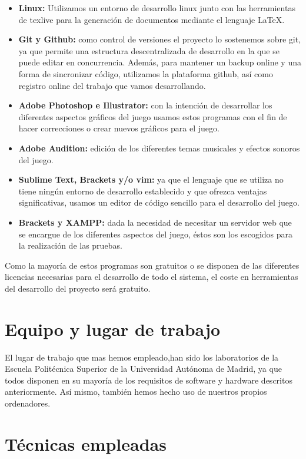 \documentclass[palatino]{apuntes}
\begin{document}
\begin{itemize}
\begin{itemize}
	\item \textbf{Linux:} Utilizamos un entorno de desarrollo linux junto con las herramientas de texlive para la generación de documentos mediante el lenguaje \LaTeX.
	\item \textbf{Git y Github:} como control de versiones el proyecto lo sostenemos sobre git, ya que permite una estructura descentralizada de desarrollo en la que se puede editar en concurrencia. Además, para mantener un backup online y una forma de sincronizar código, utilizamos la plataforma github, así como registro online del trabajo que vamos desarrollando.
	\item \textbf{Adobe Photoshop e Illustrator:} con la intención de desarrollar los diferentes aspectos gráficos del juego usamos estos programas con el fin de hacer correcciones o crear nuevos gráficos para el juego.
	\item \textbf{Adobe Audition:} edición de los diferentes temas musicales y efectos sonoros del juego.
	\item \textbf{Sublime Text, Brackets y/o vim:} ya que el lenguaje que se utiliza no tiene ningún entorno de desarrollo establecido y que ofrezca ventajas significativas, usamos un editor de código sencillo para el desarrollo del juego.
	\item \textbf{Brackets y XAMPP:} dada la necesidad de necesitar un servidor web que se encargue de los diferentes aspectos del juego, éstos son los escogidos para la realización de las pruebas.
\end{itemize}

Como la mayoría de estos programas son gratuitos o se disponen de las diferentes licencias necesarias para el desarrollo de todo el sistema, el coste en herramientas del desarrollo del proyecto será gratuito.


\section{Equipo y lugar de trabajo}

El lugar de trabajo que mas hemos empleado,han sido los laboratorios de la Escuela Politécnica Superior de la Universidad Autónoma de Madrid, ya que todos disponen en su mayoría de los requisitos de software y hardware descritos anteriormente. Así mismo, también hemos hecho uso de nuestros propios ordenadores.

\section{Técnicas empleadas}




\end{itemize}
\end{document}

